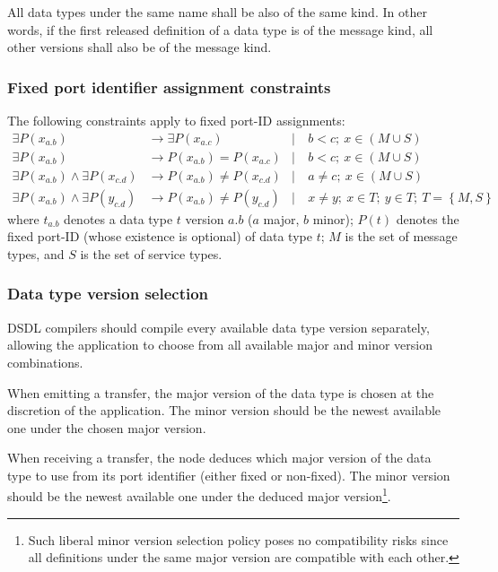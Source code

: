 All data types under the same name shall be also of the same kind.
In other words, if the first released definition of a data type is of the message kind,
all other versions shall also be of the message kind.

\subsubsection{Fixed port identifier assignment constraints}

The following constraints apply to fixed port-ID assignments:
\begin{align*}
    \exists P(x_{a.b})                          &\rightarrow \exists P(x_{a.c})
    &\mid&\ b < c;\ x \in (M \cup S)
    \\
    \exists P(x_{a.b})                          &\rightarrow         P(x_{a.b}) =    P(x_{a.c})
    &\mid&\ b < c;\ x \in (M \cup S)
    \\
    \exists P(x_{a.b}) \land \exists P(x_{c.d}) &\rightarrow         P(x_{a.b}) \neq P(x_{c.d})
    &\mid&\ a \neq c;\ x \in (M \cup S)
    \\
    \exists P(x_{a.b}) \land \exists P(y_{c.d}) &\rightarrow         P(x_{a.b}) \neq P(y_{c.d})
    &\mid&\ x \neq y;\ x \in T;\ y \in T;\ T = \left\{ M, S \right\}
\end{align*}
where $t_{a.b}$ denotes a data type $t$ version $a.b$ ($a$ major, $b$ minor);
$P(t)$ denotes the fixed port-ID (whose existence is optional) of data type $t$;
$M$ is the set of message types, and $S$ is the set of service types.

\subsubsection{Data type version selection}

DSDL compilers should compile every available data type version separately,
allowing the application to choose from all available major and minor version combinations.

When emitting a transfer, the major version of the data type is chosen at the discretion of the application.
The minor version should be the newest available one under the chosen major version.

When receiving a transfer, the node deduces which major version of the data type to use
from its port identifier (either fixed or non-fixed).
The minor version should be the newest available one under the deduced major version\footnote{%
Such liberal minor version selection policy poses no compatibility risks since all definitions under the same
major version are compatible with each other.}.

